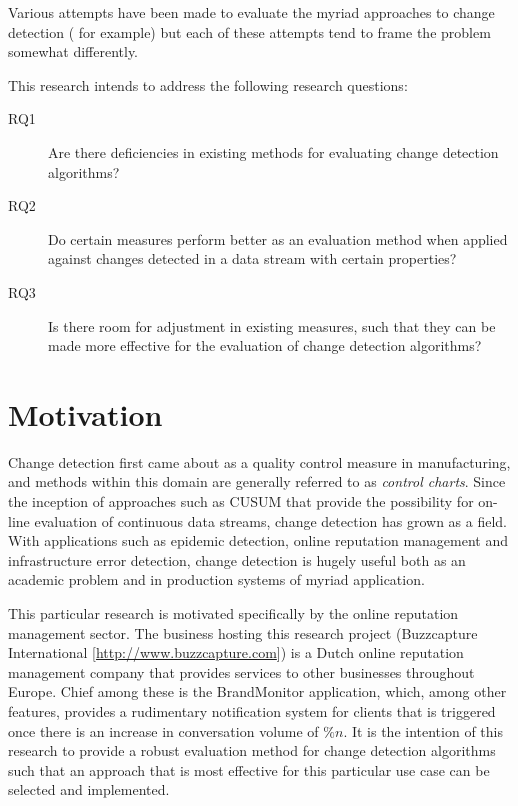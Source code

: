 \documentclass{uvamscse}	%
\begin{document}
Various attempts have been made to evaluate the myriad approaches to change detection (\cite{Buntain2014} for example) but each of these attempts tend to frame the problem somewhat differently.

This research intends to address the following research questions:


\begin{description}
	\item[RQ1] Are there deficiencies in existing methods for evaluating change detection algorithms?
	\item[RQ2] Do certain measures perform better as an evaluation method when applied against changes detected in a data stream with certain properties?
	\item[RQ3] Is there room for adjustment in existing measures, such that they can be made more effective for the evaluation of change detection algorithms?
\end{description}


\section{Motivation}

Change detection first came about as a quality control measure in manufacturing, and methods within this domain are generally referred to as \emph{control charts}. Since the inception of approaches such as CUSUM that provide the possibility for on-line evaluation of continuous data streams, change detection has grown as a field. With applications such as epidemic detection, online reputation management and infrastructure error detection, change detection is hugely useful both as an academic problem and in production systems of myriad application.

This particular research is motivated specifically by the online reputation management sector. The business hosting this research project (Buzzcapture International [\url{http://www.buzzcapture.com}]) is a Dutch online reputation management company that provides services to other businesses throughout Europe. Chief among these is the BrandMonitor application, which, among other features, provides a rudimentary notification system for clients that is triggered once there is an increase in conversation volume of $\%n$. It is the intention of this research to provide a robust evaluation method for change detection algorithms such that an approach that is most effective for this particular use case can be selected and implemented.
\end{document}

